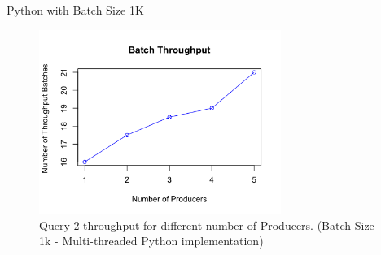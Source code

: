 \documentclass[9pt]{beamer}
\begin{document}
\begin{frame}[fragile]{Python with Batch Size 1K  }
    
    \begin{figure}
        \begin{center}
            \includegraphics[width=0.7\textwidth]{../paper/images/throughput.png}
            \caption{Query 2 throughput for different number of Producers. (Batch Size 1k - Multi-threaded Python implementation) }
            \label{fig:evaluation}
        \end{center}
    \end{figure}
\end{frame}






\end{document}
